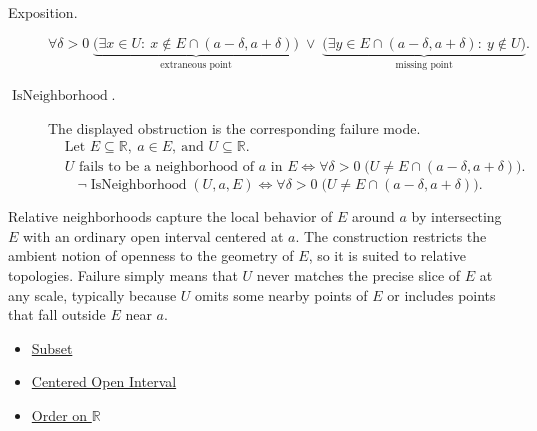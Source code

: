 \begin{remark*}
\begin{description}
  \item[Exposition.]
\[
\forall \delta > 0\;
\underbrace{\bigl(\exists x \in U:\ x \notin E \cap (a-\delta,a+\delta)\bigr)}_{\text{extraneous point}}
\;\lor\;
\underbrace{\bigl(\exists y \in E \cap (a-\delta,a+\delta):\ y \notin U\bigr)}_{\text{missing point}}.
\]


  \item[\(\operatorname{IsNeighborhood}.\)]
  The displayed obstruction is the corresponding failure mode.
  \[
\begin{aligned}
&\text{Let } E \subseteq \mathbb{R},\ a \in E,\ \text{and } U \subseteq \mathbb{R}.\\
&U \text{ fails to be a neighborhood of } a \text{ in } E
\Longleftrightarrow
\forall \delta > 0\; \bigl(U \ne E \cap (a-\delta, a+\delta)\bigr).
\end{aligned}
  \]
  \[
\neg \operatorname{IsNeighborhood}(U,a,E)
\Longleftrightarrow
\forall \delta > 0\;
\bigl(U \ne E \cap (a-\delta, a+\delta)\bigr).
  \]
\end{description}
\end{remark*}

\begin{remark*}[Interpretation]
Relative neighborhoods capture the local behavior of $E$ around $a$ by intersecting $E$ with an ordinary open interval centered at $a$. The construction restricts the ambient notion of openness to the geometry of $E$, so it is suited to relative topologies. Failure simply means that $U$ never matches the precise slice of $E$ at any scale, typically because $U$ omits some nearby points of $E$ or includes points that fall outside $E$ near $a$.
\end{remark*}

\begin{dependencies}
\begin{itemize}
  \item \hyperref[def:subset]{Subset}
  \item \hyperref[def:epsilon-neighbourhood]{Centered Open Interval}
  \item \hyperref[def:order-on-r]{Order on $\mathbb{R}$}
\end{itemize}
\end{dependencies}

